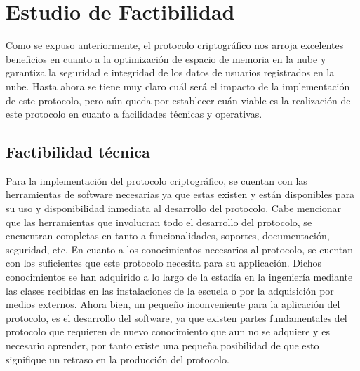 

\section{Estudio de Factibilidad}

Como se expuso anteriormente, el protocolo criptográfico nos arroja excelentes beneficios en cuanto a la optimización de espacio de memoria en la nube y garantiza la seguridad e integridad de los datos de usuarios registrados en la nube. Hasta ahora se tiene muy claro cuál será el impacto de la implementación de este protocolo, pero aún queda por establecer cuán viable es la realización de este protocolo en cuanto a facilidades técnicas y operativas.


\subsection{Factibilidad técnica}

Para la implementación del protocolo criptográfico, se cuentan con las herramientas de software necesarias ya que estas existen y están disponibles para su uso y disponibilidad inmediata al desarrollo del protocolo. Cabe mencionar que las herramientas que involucran todo el desarrollo del protocolo, se encuentran completas en tanto a funcionalidades, soportes, documentación, seguridad, etc. 
En cuanto a los conocimientos necesarios al protocolo, se cuentan con los suficientes que este protocolo necesita para su applicación. Dichos conocimientos se han adquirido a lo largo de la estadía en la ingeniería mediante las clases recibidas en las instalaciones de la  escuela o por la adquisición por medios externos. Ahora bien, un pequeño inconveniente para la aplicación del protocolo, es el desarrollo del software, ya que existen partes fundamentales del protocolo que requieren de nuevo conocimiento que aun no se adquiere y es necesario aprender, por tanto existe una pequeña posibilidad de que esto signifique un retraso en la producción del protocolo. 

